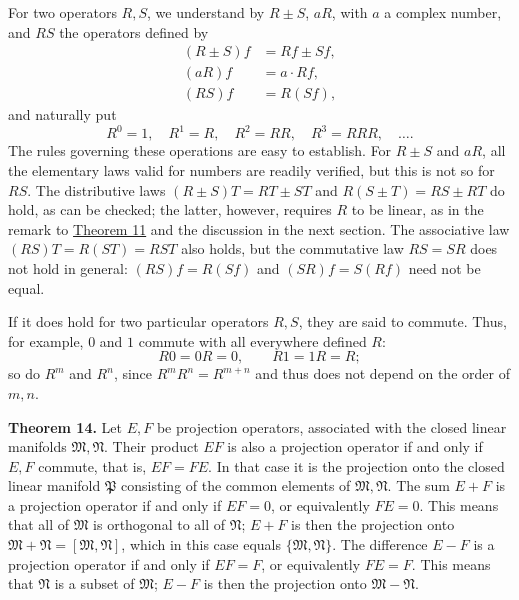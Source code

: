 \documentclass[fontsize=13pt,twoside,openany,headings=normal,parskip=false,bookmarkpackage=false,DIV=calc]{scrbook}
\begin{document}
For two operators $R,S$, we understand by $R\pm S$, $aR$, with $a$ a complex number, and $RS$ the operators defined by
\begin{align*}
(R\pm S)f&=Rf\pm Sf,\\
(aR)f&=a\cdot Rf,\\
(RS)f&=R(Sf),
\end{align*}
and naturally put
\[
R^0=1,\quad R^1=R,\quad R^2=RR,\quad R^3=RRR,\quad\ldots.
\]
The rules governing these operations are easy to establish. For $R\pm S$ and $aR$, all the elementary laws valid for numbers are readily verified, but this is not so for $RS$. The distributive laws $(R\pm S)T=RT\pm ST$ and $R(S\pm T)=RS\pm RT$ do hold, as can be checked; the latter, however, requires $R$ to be linear, as in the remark to \hyperref[thm:II.11]{Theorem 11} and the discussion in the next section. The associative law $(RS)T=R(ST)=RST$ also holds, but the commutative law $RS=SR$ does not hold in general: $(RS)f=R(Sf)$ and $(SR)f=S(Rf)$ need not be equal.

\hypertarget{origpage-43}{}%
If it does hold for two particular operators $R,S$, they are said to commute. Thus, for example, $0$ and $1$ commute with all everywhere defined $R$:
\[
R0=0R=0,\qquad R1=1R=R;
\]
so do $R^m$ and $R^n$, since $R^mR^n=R^{m+n}$ and thus does not depend on the order of $m,n$.

\leavevmode{}\textbf{Theorem 14.}\label{thm:II.14} Let $E,F$ be projection operators, associated with the closed linear manifolds $\mathfrak{M},\mathfrak{N}$. Their product $EF$ is also a projection operator if and only if $E,F$ commute, that is, $EF=FE$. In that case it is the projection onto the closed linear manifold $\mathfrak{P}$ consisting of the common elements of $\mathfrak{M},\mathfrak{N}$. The sum $E+F$ is a projection operator if and only if $EF=0$, or equivalently $FE=0$. This means that all of $\mathfrak{M}$ is orthogonal to all of $\mathfrak{N}$; $E+F$ is then the projection onto $\mathfrak{M}+\mathfrak{N}=[\mathfrak{M},\mathfrak{N}]$, which in this case equals $\{\mathfrak{M},\mathfrak{N}\}$. The difference $E-F$ is a projection operator if and only if $EF=F$, or equivalently $FE=F$. This means that $\mathfrak{N}$ is a subset of $\mathfrak{M}$; $E-F$ is then the projection onto $\mathfrak{M}-\mathfrak{N}$.
\end{document}

